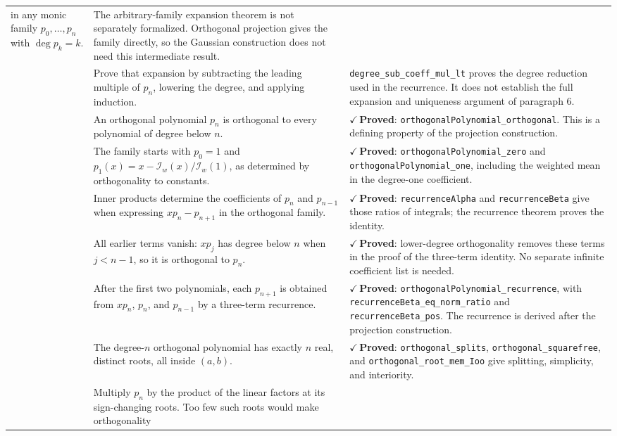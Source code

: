 \documentclass[11pt]{article}
\newcommand{\checked}[1]{\textcolor{provedcolor}{\ensuremath{\checkmark}\,\textbf{#1}}}
\newcommand{\proved}{\checked{Proved}}
\newcommand{\I}{\mathcal{I}}
\newcommand{\code}[1]{%
  \ifmmode\text{\texttt{\detokenize{#1}}}\else\nolinkurl{#1}\fi}
\begin{document}
\begin{longtable}{@{}>{\raggedright\arraybackslash}p{0.45cm}
  >{\raggedright\arraybackslash}p{6.0cm}
  >{\raggedright\arraybackslash}p{8.75cm}@{}}
in any monic family $p_0,\ldots,p_n$ with $\deg p_k=k$. &
The arbitrary-family expansion theorem is not separately formalized.
Orthogonal projection gives the family directly, so the Gaussian
construction does not need this intermediate result.\\
\addlinespace
7 & Prove that expansion by subtracting the leading multiple of
$p_n$, lowering the degree, and applying induction. &
\code{degree_sub_coeff_mul_lt} proves the degree reduction used in
the recurrence. It does not establish the full expansion and uniqueness
argument of paragraph 6.\\
\addlinespace
8 & An orthogonal polynomial $p_n$ is orthogonal to every polynomial
of degree below $n$. &
\proved{}: \code{orthogonalPolynomial_orthogonal}. This is a defining
property of the projection construction.\\
\addlinespace
9 & The family starts with $p_0=1$ and
$p_1(x)=x-\I_w(x)/\I_w(1)$, as determined by orthogonality to constants. &
\proved{}: \code{orthogonalPolynomial_zero} and \code{orthogonalPolynomial_one},
including the weighted mean in the degree-one coefficient.\\
\addlinespace
10 & Inner products determine the coefficients of $p_n$ and $p_{n-1}$
when expressing $xp_n-p_{n+1}$ in the orthogonal family. &
\proved{}: \code{recurrenceAlpha} and \code{recurrenceBeta} give those
ratios of integrals; the recurrence theorem proves the identity.\\
\addlinespace
11 & All earlier terms vanish: $xp_j$ has degree below $n$ when
$j<n-1$, so it is orthogonal to $p_n$. &
\proved{}: lower-degree orthogonality removes these terms in the proof
of the three-term identity. No separate infinite coefficient list is needed.\\
\addlinespace
12 & After the first two polynomials, each $p_{n+1}$ is obtained
from $xp_n$, $p_n$, and $p_{n-1}$ by a three-term recurrence. &
\proved{}: \code{orthogonalPolynomial_recurrence}, with
\code{recurrenceBeta_eq_norm_ratio} and \code{recurrenceBeta_pos}.
The recurrence is derived after the projection construction.\\
\addlinespace
13 & The degree-$n$ orthogonal polynomial has exactly $n$ real,
distinct roots, all inside $(a,b)$. &
\proved{}: \code{orthogonal_splits}, \code{orthogonal_squarefree}, and
\code{orthogonal_root_mem_Ioo} give splitting, simplicity, and interiority.\\
\addlinespace
14 & Multiply $p_n$ by the product of the linear factors at its
sign-changing roots. Too few such roots would make orthogonality

\end{longtable}
\end{document}
